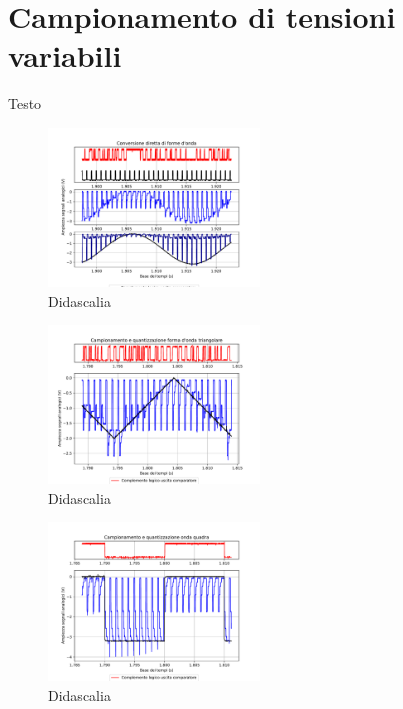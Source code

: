 \documentclass[journal]{IEEEtran}
\begin{document}
\section{Campionamento di tensioni variabili}
Testo

\begin{figure}[H]%
\begin{center}
\includegraphics[trim = {0 25 0 0},clip, width=0.50\textwidth]{analysis/output/direct_aq_waveforms.pdf}
\caption{Didascalia}
\label{fig:circuit_DAC}
\end{center}
\end{figure}

\begin{figure}[H]%
\begin{center}
\includegraphics[trim = {0 25 0 0},clip, width=0.50\textwidth]{analysis/output/triangle_wave_aq.pdf}
\caption{Didascalia}
\label{fig:circuit_DAC}
\end{center}
\end{figure}

\begin{figure}[H]%
\begin{center}
\includegraphics[trim = {0 25 0 0},clip, width=0.50\textwidth]{analysis/output/square_wave_aq.pdf}
\caption{Didascalia}
\label{fig:circuit_DAC}
\end{center}
\end{figure}
\end{document}
